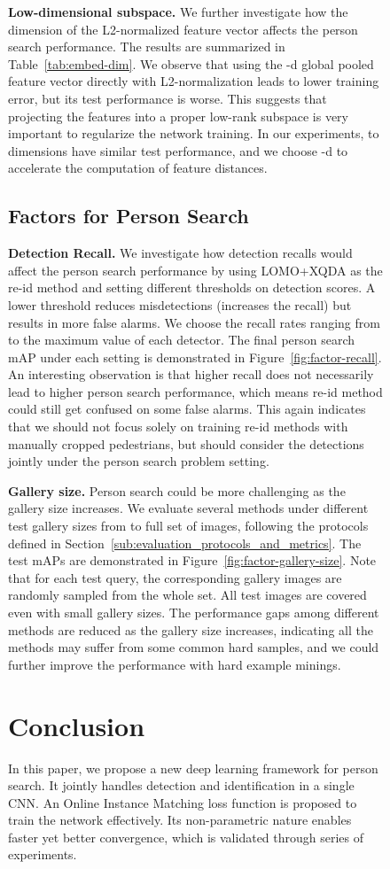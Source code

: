 \documentclass[10pt,twocolumn,letterpaper]{article}
\begin{document}
\begin{figure}[t]
\begin{center}
\textbf{Low-dimensional subspace.} We further investigate how the dimension of the L2-normalized feature vector affects the person search performance. The results are summarized in Table~\ref{tab:embed-dim}. We observe that using the -d global pooled feature vector directly with L2-normalization leads to lower training error, but its test performance is  worse. This suggests that projecting the features into a proper low-rank subspace is very important to regularize the network training. In our experiments,  to  dimensions have similar test performance, and we choose -d to accelerate the computation of feature distances.


\subsection{Factors for Person Search} \label{sub:factors_for_person_search}
\textbf{Detection Recall.} We investigate how detection recalls would affect the person search performance by using LOMO+XQDA as the re-id method and setting different thresholds on detection scores. A lower threshold reduces misdetections (increases the recall) but results in more false alarms. We choose the recall rates ranging from  to the maximum value of each detector. The final person search mAP under each setting is demonstrated in Figure~\ref{fig:factor-recall}. An interesting observation is that higher recall does not necessarily lead to higher person search performance, which means re-id method could still get confused on some false alarms. This again indicates that we should not focus solely on training re-id methods with manually cropped pedestrians, but should consider the detections jointly under the person search problem setting.

\textbf{Gallery size.} Person search could be more challenging as the gallery size increases. We evaluate several methods under different test gallery sizes from  to full set of  images, following the protocols defined in Section~\ref{sub:evaluation_protocols_and_metrics}. The test mAPs are demonstrated in Figure~\ref{fig:factor-gallery-size}. Note that for each test query, the corresponding gallery images are randomly sampled from the whole set. All test images are covered even with small gallery sizes. The performance gaps among different methods are reduced as the gallery size increases, indicating all the methods may suffer from some common hard samples, and we could further improve the performance with hard example minings.

\section{Conclusion} \label{sec:conclusion}
In this paper, we propose a new deep learning framework for person search. It jointly handles detection and identification in a single CNN. An Online Instance Matching loss function is proposed to train the network effectively. Its non-parametric nature enables faster yet better convergence, which is validated through series of experiments.\\


\end{center}
\end{figure}
\end{document}
